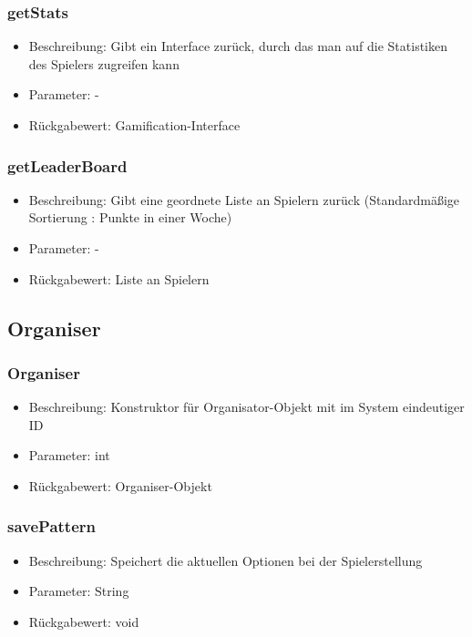 \documentclass[a4paper]{scrreprt}
\begin{document}
    \subsubsection{getStats}
    \begin{itemize}
        \item Beschreibung: Gibt ein Interface zurück, durch das man auf die Statistiken des Spielers zugreifen kann
        \item Parameter: -
        \item Rückgabewert: Gamification-Interface
    \end{itemize}
    \subsubsection{getLeaderBoard}
    \begin{itemize}
        \item Beschreibung: Gibt eine geordnete Liste an Spielern zurück (Standardmäßige Sortierung : Punkte in einer Woche)
        \item Parameter: -
        \item Rückgabewert: Liste an Spielern
    \end{itemize}

    \subsection{Organiser}
    \subsubsection{Organiser}
    \begin{itemize}
        \item Beschreibung: Konstruktor für Organisator-Objekt mit im System eindeutiger ID
        \item Parameter: int
        \item Rückgabewert: Organiser-Objekt
    \end{itemize}
    \subsubsection{savePattern}
    \begin{itemize}
        \item Beschreibung: Speichert die aktuellen Optionen bei der Spielerstellung
        \item Parameter: String
        \item Rückgabewert: void
    \end{itemize}
\end{document}
